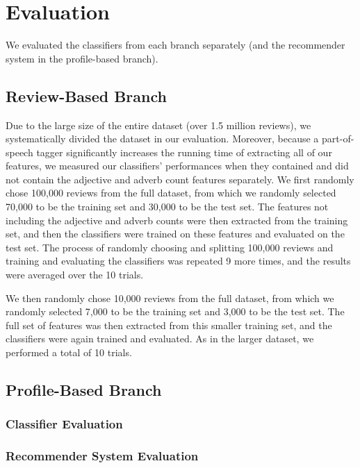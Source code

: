 \section{Evaluation}

We evaluated the classifiers from each branch separately (and the recommender system in the profile-based branch).

\subsection{Review-Based Branch}
Due to the large size of the entire dataset (over 1.5 million reviews), we systematically divided the dataset in our evaluation. Moreover, because a part-of-speech tagger significantly increases the running time of extracting all of our features, we measured our classifiers' performances when they contained and did not contain the adjective and adverb count features separately. We first randomly chose 100,000 reviews from the full dataset, from which we randomly selected 70,000 to be the training set and 30,000 to be the test set. The features not including the adjective and adverb counts were then extracted from the training set, and then the classifiers were trained on these features and evaluated on the test set. The process of randomly choosing and splitting 100,000 reviews and training and evaluating the classifiers was repeated 9 more times, and the results were averaged over the 10 trials.

We then randomly chose 10,000 reviews from the full dataset, from which we randomly selected 7,000 to be the training set and 3,000 to be the test set. The full set of features was then extracted from this smaller training set, and the classifiers were again trained and evaluated. As in the larger dataset, we performed a total of 10 trials.

\subsection{Profile-Based Branch}

\subsubsection{Classifier Evaluation}

\subsubsection{Recommender System Evaluation}